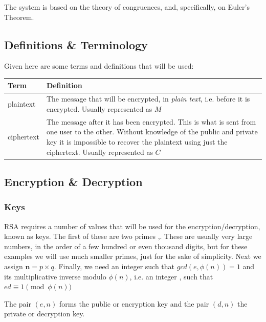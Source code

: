 \documentclass[12pt, titlepage]{article}
\begin{document}
The system is based on the theory of congruences, and, specifically, on Euler's Theorem.

\subsection{Definitions \& Terminology}

Given here are some terms and definitions that will be used:
%
\begin{table}[H]
    \begin{tabular}{ | m{5em} | p{30em} | }
        \hline
        Term      & Definition\\
        \hline
        plaintext & The message that will be encrypted, in \emph{plain
                    text}, i.e. before it is encrypted. Usually represented as $M$\\
        \hline
        ciphertext & The message after it has been encrypted. This is what
                     is sent from one user to the other. Without
                     knowledge of the public and private key it is
                     impossible to recover the plaintext using just the
                     ciphertext. Usually represented as $C$\\
        \hline
    \end{tabular}
\end{table}
%

\subsection{Encryption \& Decryption}

\subsubsection{Keys}

RSA requires a number of values that will be used for the encryption/decryption, known as
keys.  The first of these are two primes ,. These are usually very large
numbers, in the order of a few hundred or even thousand digits, but for these examples we
will use much smaller primes, just for the sake of simplicity. Next we assign $\pmb{n}=p
\times q$.  Finally, we need an integer  such that $gcd(e, \phi (n)) = 1$ and its
multiplicative inverse modulo $\phi(n)$, i.e. an integer , such that $ed \equiv 1
\pmod{\phi(n)}$

The pair $(e, n)$ forms the public or encryption key and the pair $(d, n)$ the private or
decryption key.
\end{document}
